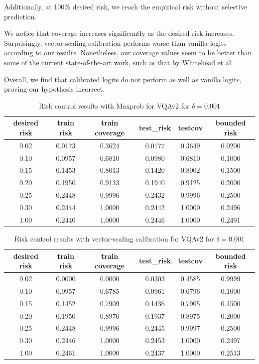 \documentclass[
	english,
	accentcolor=8b,
	type=intern,
	marginpar=false
	]{tudapub}
\begin{document}
Additionally, at 100\% desired risk, we reach the empirical risk without selective prediction.

We notice that coverage increases significantly as the desired risk increases. Surprisingly, vector-scaling calibration performs worse than vanilla logits according to our results. Nonetheless, our coverage values seem to be better than some of the current state-of-the-art work, such as that by \href{https://openaccess.thecvf.com/content/CVPR2023/papers/Dancette_Improving_Selective_Visual_Question_Answering_by_Learning_From_Your_Peers_CVPR_2023_paper.pdf}{Whitehead et al.}

Overall, we find that calibrated logits do not perform as well as vanilla logits, proving our hypothesis incorrect.


\begin{table}[h]
\begin{tabular}{|c|c|c|c|c|c|}
\hline
desired risk & train risk & train coverage & test\_risk & testcov& bounded risk \\ \hline
0.02 & 0.0173 & 0.3624 & 0.0177 & 0.3649 & 0.0200  \\
0.10 & 0.0957 & 0.6810 & 0.0980 & 0.6810 & 0.1000  \\
0.15 & 0.1453 & 0.8013 & 0.1420 & 0.8002 & 0.1500  \\
0.20 & 0.1950 & 0.9133 & 0.1940 & 0.9125 & 0.2000  \\
0.25 & 0.2448 & 0.9996 & 0.2432 & 0.9996 & 0.2500  \\
0.30 & 0.2444 & 1.0000 & 0.2442 & 1.0000 & 0.2496  \\
1.00 & 0.2440 & 1.0000 & 0.2446 & 1.0000 & 0.2491  \\
\hline
\end{tabular}
\caption{Risk control results with Maxprob for VQAv2 for $\delta = 0.001$ }
\label{tab:max_prob_selective_prediction}
\end{table}
\begin{table}[h]
\begin{tabular}{|c|c|c|c|c|c|}
\hline
desired risk & train risk & train coverage & test\_risk & testcov& bounded risk \\ \hline
0.02 & 0.0000 & 0.0000 & 0.0303 & 0.4585 & 0.9999  \\
0.10 & 0.0957 & 0.6785 & 0.0961 & 0.6796 & 0.1000  \\
0.15 & 0.1452 & 0.7909 & 0.1436 & 0.7905 & 0.1500  \\
0.20 & 0.1950 & 0.8976 & 0.1937 & 0.8975 & 0.2000  \\
0.25 & 0.2448 & 0.9996 & 0.2445 & 0.9997 & 0.2500  \\
0.30 & 0.2446 & 1.0000 & 0.2453 & 1.0000 & 0.2497  \\
1.00 & 0.2461 & 1.0000 & 0.2437 & 1.0000 & 0.2513  \\
\hline
\end{tabular}
\caption{Risk control results with vector-scaling calibration for VQAv2 for $\delta = 0.001$ }
\label{tab:vec_scal_selective_prediction}
\end{table}
\end{document}
